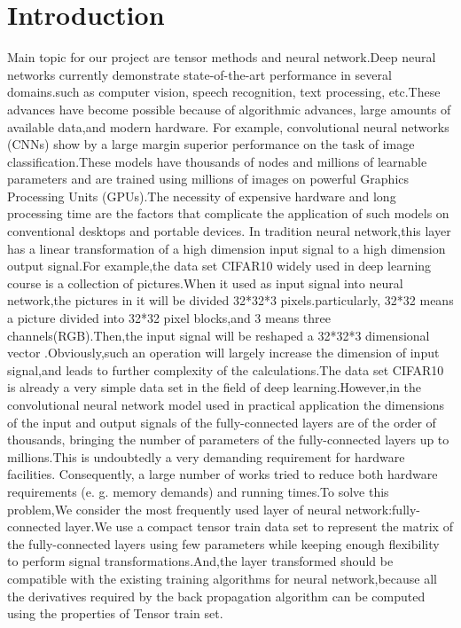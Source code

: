 \documentclass[onecolumn, conference]{IEEEtran}
\begin{document}

\section{Introduction}
Main topic for our project are tensor methods and neural network.Deep neural networks currently demonstrate state-of-the-art performance in several domains.such as computer vision, speech recognition, text processing, etc.These advances have become possible because of algorithmic advances, large amounts of available data,and modern hardware. For example, convolutional neural networks (CNNs) \cite{b1}\cite{b2}show by a large margin superior performance on the task of image classification.These models have thousands of nodes and millions of learnable parameters and are trained using millions of images\cite{b3} on powerful Graphics Processing Units (GPUs).The necessity of expensive hardware and long processing time are the factors that complicate the application of such models on conventional desktops and portable devices.
In tradition neural network,this layer has a linear transformation of a high dimension input signal to a high dimension output signal.For example,the data set CIFAR10 widely used in deep learning course is a collection of pictures.When it used as input signal into neural network,the pictures in it will be divided 32*32*3 pixels.particularly, 32*32 means a picture divided into 32*32 pixel blocks,and 3 means three channels(RGB).Then,the input signal will be reshaped a 32*32*3 dimensional vector .Obviously,such an operation will largely increase the dimension of input signal,and leads to  further complexity of the calculations.The data set CIFAR10\cite{b5} is already a very simple data set in the field of deep learning.However,in the convolutional neural network model used in practical application the dimensions of the input and output signals of the fully-connected layers are of the order of thousands, bringing the number of parameters of the fully-connected layers up to millions.This is undoubtedly a very demanding requirement for hardware facilities.
Consequently, a large number of works tried to reduce both hardware requirements (e. g. memory demands) and running times.To solve this problem,We consider the most frequently used layer of neural network:fully-connected layer.We use a compact tensor train data set to represent the matrix of the fully-connected layers using few parameters while keeping enough flexibility to perform signal transformations\cite{b6}.And,the layer transformed should be compatible with the existing training algorithms for neural network,because all the derivatives required by the back propagation algorithm\cite{b4} can be computed using the properties of Tensor train set.
\end{document}
